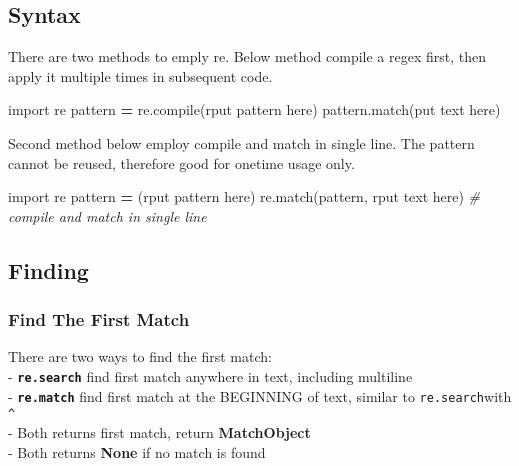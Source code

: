 \documentclass[
]{book}
\newenvironment{Shaded}{\begin{snugshade}}{\end{snugshade}}
\newcommand{\BuiltInTok}[1]{#1}
\newcommand{\CommentTok}[1]{\textcolor[rgb]{0.37,0.37,0.37}{\textit{#1}}}
\newcommand{\ImportTok}[1]{#1}
\newcommand{\NormalTok}[1]{#1}
\newcommand{\OperatorTok}[1]{\textcolor[rgb]{0.43,0.43,0.43}{\textbf{#1}}}
\newcommand{\StringTok}[1]{\textcolor[rgb]{0.5,0.5,0.5}{#1}}
\newcommand{\VerbatimStringTok}[1]{\textcolor[rgb]{0.5,0.5,0.5}{#1}}
\begin{document}
\hypertarget{syntax}{%
\subsection{Syntax}\label{syntax}}

There are two methods to emply re. Below method compile a regex first, then apply it multiple times in subsequent code.

\begin{Shaded}
\begin{Highlighting}[]
\ImportTok{import}\NormalTok{ re}
\NormalTok{pattern }\OperatorTok{=}\NormalTok{ re.}\BuiltInTok{compile}\NormalTok{(}\VerbatimStringTok{r\textquotesingle{}put pattern here\textquotesingle{}}\NormalTok{)}
\NormalTok{pattern.match(}\StringTok{\textquotesingle{}put text here\textquotesingle{}}\NormalTok{)}
\end{Highlighting}
\end{Shaded}

Second method below employ compile and match in single line. The pattern cannot be reused, therefore good for onetime usage only.

\begin{Shaded}
\begin{Highlighting}[]
\ImportTok{import}\NormalTok{ re}
\NormalTok{pattern }\OperatorTok{=}\NormalTok{ (}\VerbatimStringTok{r\textquotesingle{}put pattern here\textquotesingle{}}\NormalTok{)}
\NormalTok{re.match(pattern, }\VerbatimStringTok{r\textquotesingle{}put text here\textquotesingle{}}\NormalTok{)  }\CommentTok{\# compile and match in single line}
\end{Highlighting}
\end{Shaded}

\hypertarget{finding}{%
\subsection{Finding}\label{finding}}

\hypertarget{find-the-first-match}{%
\subsubsection{Find The First Match}\label{find-the-first-match}}

There are two ways to find the first match:\\
- \textbf{\texttt{re.search}} find first match anywhere in text, including multiline\\
- \textbf{\texttt{re.match}} find first match at the BEGINNING of text, similar to \texttt{re.search}with \texttt{\^{}}\\
- Both returns first match, return \textbf{MatchObject}\\
- Both returns \textbf{None} if no match is found
\end{document}
